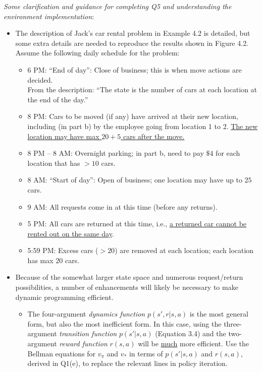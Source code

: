 \documentclass{article}
\begin{document}
\begin{enumerate}
	      \textit{Some clarification and guidance for completing Q5 and understanding the environment implementation}:
	      \begin{itemize}
		      \item The description of Jack's car rental problem in Example 4.2 is detailed, but some extra details are needed to reproduce the results shown in Figure 4.2. Assume the following daily schedule for the problem:
		            \begin{itemize}
			            \item 6 PM: ``End of day'': Close of business; this is when move actions are decided. \\
			                  From the description: ``The state is the number of cars at each location at the end of the day.''
			            \item 8 PM: Cars to be moved (if any) have arrived at their new location, including (in part b) by the employee going from location 1 to 2. \uline{The new location may have max $20 + 5$ cars after the move.}
			            \item 8 PM -- 8 AM: Overnight parking; in part b, need to pay $\$4$ for each location that has $> 10$ cars.
			            \item 8 AM: ``Start of day'': Open of business; one location may have up to $25$ cars.
			            \item 9 AM: All requests come in at this time (before any returns).
			            \item 5 PM: All cars are returned at this time, i.e., \uline{a returned car cannot be rented out on the same day}.
			            \item 5:59 PM: Excess cars ($> 20$) are removed at each location; each location has max $20$ cars.
		            \end{itemize}
		      \item Because of the somewhat larger state space and numerous request/return possibilities, a number of enhancements will likely be necessary to make dynamic programming efficient.
		            \begin{itemize}
			            \item The four-argument \textit{dynamics function} $p(s', r | s, a)$ is the most general form, but also the most inefficient form. In this case, using the three-argument \textit{transition function} $p(s' | s, a)$ (Equation 3.4) and the two-argument \textit{reward function} $r(s, a)$ will be \uline{much} more efficient. Use the Bellman equations for $v_\pi$ and $v_*$ in terms of $p(s' | s, a)$ and $r(s, a)$, derived in Q1(e), to replace the relevant lines in policy iteration.

\end{itemize}
\end{itemize}
\end{enumerate}
\end{document}
